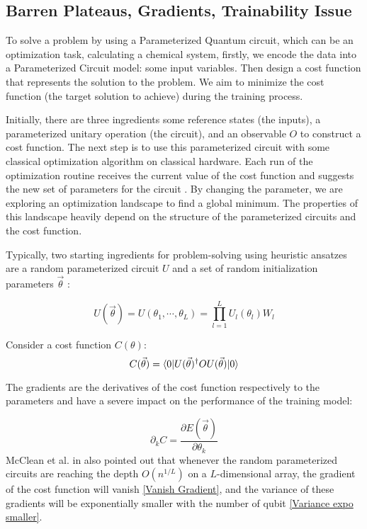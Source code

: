 \subsection{Barren Plateaus, Gradients, Trainability Issue}

To solve a problem by using a Parameterized Quantum circuit, which can be an optimization task, calculating a chemical system, firstly, we encode the data into a Parameterized Circuit model: some input variables. 
Then design a cost function that represents the solution to the problem. We aim to minimize the cost function (the target solution to achieve) during the training process.

Initially, there are three ingredients some reference states (the inputs), a parameterized unitary operation (the circuit), and an observable $O$ to construct a cost function.
The next step is to use this parameterized circuit with some classical optimization algorithm on classical hardware.
Each run of the optimization routine receives the current value of the cost function and suggests the new set of parameters for the circuit \cite{cerezo2021variational}.
By changing the parameter, we are exploring an optimization landscape to find a global minimum.
The properties of this landscape heavily depend on the structure of the parameterized circuits and the cost function.

Typically, two starting ingredients for problem-solving using heuristic ansatzes are a random parameterized circuit $U$ and a set of random initialization parameters $\vec{\theta}$ \cite{mccleanBarrenPlateausQuantum2018}:

\begin{equation}\label{Parameterized Circuit}
    U(\vec{\theta})
    = U(\theta_1, \cdots, \theta_L)
    = \prod_{l=1}^L U_l(\theta_l)W_l
\end{equation}

Consider a cost function $C(\theta)$:
\begin{equation}\label{Cost function}
    C(\vec{\theta})
    = \bra{0} U(\vec{\theta})^\dagger OU(\vec{\theta}) \ket{0}
\end{equation}

The gradients are the derivatives of the cost function respectively to the parameters and have a severe impact on the performance of the training model:

\begin{equation}
    \partial_k C = \frac{\partial E(\vec{\theta})}{\partial\theta_k}
\end{equation}
McClean et al. in \cite{mccleanBarrenPlateausQuantum2018} also pointed out that whenever the random parameterized circuits are reaching the depth $O(n^{1/L})$ on a $L$-dimensional array, the gradient of the cost function will vanish \ref{Vanish Gradient}, and the variance of these gradients will be exponentially smaller with the number of qubit \ref{Variance expo smaller}. 

